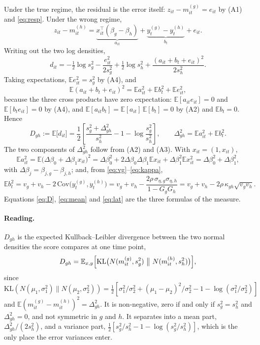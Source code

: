 \documentclass[11pt]{article}
\newcommand{\E}{\mathbb{E}}
\newcommand{\Cov}{\mathrm{Cov}}
\newcommand{\KL}{\mathrm{KL}}
\begin{document}
Under the true regime, the residual is the error itself: $z_{it} - m^{(g)}_{it} = e_{it}$ by (A1) and \eqref{eq:resp}. Under the wrong regime,
\begin{equation}\label{eq:resid}
  z_{it} - m^{(h)}_{it} = \underbrace{x_{it}^\top(\beta_g - \beta_h)}_{a_{it}} + \underbrace{y^{(g)}_t - y^{(h)}_t}_{b_t} + e_{it}.
\end{equation}
Writing out the two log densities,
\[
  d_{it} = -\tfrac12 \log s^2_g - \frac{e_{it}^2}{2 s^2_g} + \tfrac12 \log s^2_h + \frac{(a_{it} + b_t + e_{it})^2}{2 s^2_h}.
\]
Taking expectations, $\E e_{it}^2 = s^2_g$ by (A4), and
\[
  \E(a_{it} + b_t + e_{it})^2 = \E a_{it}^2 + \E b_t^2 + \E e_{it}^2,
\]
because the three cross products have zero expectation: $\E[a_{it} e_{it}] = 0$ and $\E[b_t e_{it}] = 0$ by (A4), and $\E[a_{it} b_t] = \E[a_{it}]\,\E[b_t] = 0$ by (A2) and $\E b_t = 0$. Hence
\begin{equation}\label{eq:D}
  D_{gh} := \E\bigl[d_{it}\bigr] = \frac12\left[\frac{s^2_g + \Delta^2_{gh}}{s^2_h} - 1 - \log\frac{s^2_g}{s^2_h}\right],
  \qquad \Delta^2_{gh} = \E a_{it}^2 + \E b_t^2 .
\end{equation}
The two components of $\Delta^2_{gh}$ follow from (A2) and (A3). With $x_{it} = (1, x_{it})$,
\begin{equation}\label{eq:mean}
  \E a_{it}^2 = \E\bigl(\Delta\beta_0 + \Delta\beta_1 x_{it}\bigr)^2 = \Delta\beta_0^2 + 2\Delta\beta_0\Delta\beta_1\E x_{it} + \Delta\beta_1^2 \E x_{it}^2 = \Delta\beta_0^2 + \Delta\beta_1^2,
\end{equation}
with $\Delta\beta_j = \beta_{j,g} - \beta_{j,h}$; and, from \eqref{eq:vg}--\eqref{eq:kappa},
\begin{equation}\label{eq:lat}
  \E b_t^2 = v_g + v_h - 2\,\Cov\bigl(y^{(g)}_t, y^{(h)}_t\bigr) = v_g + v_h - \frac{2\rho\,\sigma_{\eta,g}\sigma_{\eta,h}}{1 - G_gG_h}
  = v_g + v_h - 2\rho\,\kappa_{gh}\sqrt{v_g v_h}.
\end{equation}
Equations \eqref{eq:D}, \eqref{eq:mean} and \eqref{eq:lat} are the three formulas of the measure.

\paragraph{Reading.} $D_{gh}$ is the expected Kullback--Leibler divergence between the two normal densities the score compares at one time point,
\[
  D_{gh} = \E_{x,y}\Bigl[\KL\bigl(N(m^{(g)}_{it}, s^2_g)\ \big\|\ N(m^{(h)}_{it}, s^2_h)\bigr)\Bigr],
\]
since $\KL(N(\mu_1,\sigma_1^2)\|N(\mu_2,\sigma_2^2)) = \tfrac12[\sigma_1^2/\sigma_2^2 + (\mu_1-\mu_2)^2/\sigma_2^2 - 1 - \log(\sigma_1^2/\sigma_2^2)]$ and $\E(m^{(g)}_{it} - m^{(h)}_{it})^2 = \Delta^2_{gh}$. It is non-negative, zero if and only if $s^2_g = s^2_h$ and $\Delta^2_{gh} = 0$, and not symmetric in $g$ and $h$. It separates into a mean part, $\Delta^2_{gh}/(2s^2_h)$, and a variance part, $\tfrac12[s^2_g/s^2_h - 1 - \log(s^2_g/s^2_h)]$, which is the only place the error variances enter.
\end{document}
